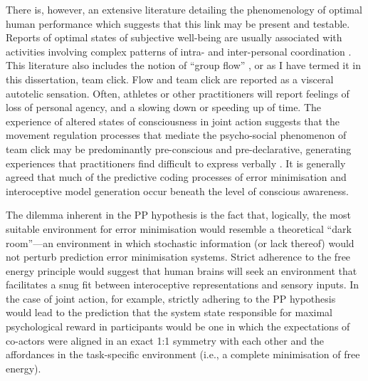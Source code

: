 \begin{CJK}{UTF8}{gbsn}
There is, however, an extensive literature detailing the phenomenology of optimal human performance which suggests that this link may be present and testable.  Reports of optimal states of subjective well-being are usually associated with activities involving complex patterns of intra- and inter-personal coordination \citep{Jackson1996}. This literature also includes the notion of ``group flow'' \citep{Sawyer2006,Noy2015}, or as I have termed it in this dissertation, team click.  Flow and team click are reported as a visceral autotelic sensation.  Often, athletes or other practitioners will report feelings of loss of personal agency, and a slowing down or speeding up of time.  The experience of altered states of consciousness in joint action suggests that the movement regulation processes that mediate the psycho-social phenomenon of team click may be predominantly pre-conscious and pre-declarative, generating experiences that practitioners find  difficult to express verbally \citep{Jackson1996,Semin2008,Rufi2015}. It is generally agreed that much of the predictive coding processes of error minimisation and interoceptive model generation occur beneath the level of conscious awareness\citep{Frith2007,Clark2013}.


The dilemma inherent in the PP hypothesis is the fact that, logically, the most suitable environment for error minimisation would resemble a theoretical ``dark room''---an environment in which stochastic information (or lack thereof) would not perturb prediction error minimisation systems\citep{Little2013}.  Strict adherence to the free energy principle would suggest that human brains will seek an environment that facilitates a snug fit between interoceptive representations and sensory inputs.  In the case of joint action, for example, strictly adhering to the PP hypothesis would lead to the prediction that the system state responsible for maximal psychological reward in participants would be one in which the expectations of co-actors were aligned in an exact 1:1 symmetry with each other and the affordances in the task-specific environment (i.e., a complete minimisation of free energy).


\end{CJK}
